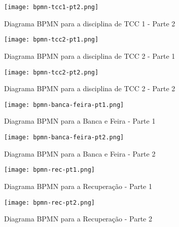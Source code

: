 \begin{figure}[H]
    \centering
    \texttt{[image: bpmn-tcc1-pt2.png]}
    \caption{Diagrama BPMN para a disciplina de TCC 1 - Parte 2}
    \label{fig:bpmn-tcc1-pt2}
\end{figure}

\begin{figure}[H]
    \centering
    \texttt{[image: bpmn-tcc2-pt1.png]}
    \caption{Diagrama BPMN para a disciplina de TCC 2 - Parte 1}
    \label{fig:bpmn-tcc2-pt1}
\end{figure}

\begin{figure}[H]
    \centering
    \texttt{[image: bpmn-tcc2-pt2.png]}
    \caption{Diagrama BPMN para a disciplina de TCC 2 - Parte 2}
    \label{fig:bpmn-tcc2-pt2}
\end{figure}

\begin{figure}[H]
    \centering
    \texttt{[image: bpmn-banca-feira-pt1.png]}
    \caption{Diagrama BPMN para a Banca e Feira - Parte 1}
    \label{fig:bpmn-banca-feira-pt1}
\end{figure}

\begin{figure}[H]
    \centering
    \texttt{[image: bpmn-banca-feira-pt2.png]}
    \caption{Diagrama BPMN para a Banca e Feira - Parte 2}
    \label{fig:bpmn-banca-feira-pt2}
\end{figure}

\begin{figure}[H]
    \centering
    \texttt{[image: bpmn-rec-pt1.png]}
    \caption{Diagrama BPMN para a Recuperação - Parte 1}
    \label{fig:bpmn-rec-pt1}
\end{figure}

\begin{figure}[H]
    \centering
    \texttt{[image: bpmn-rec-pt2.png]}
    \caption{Diagrama BPMN para a Recuperação - Parte 2}
    \label{fig:bpmn-rec-pt2}
\end{figure}
